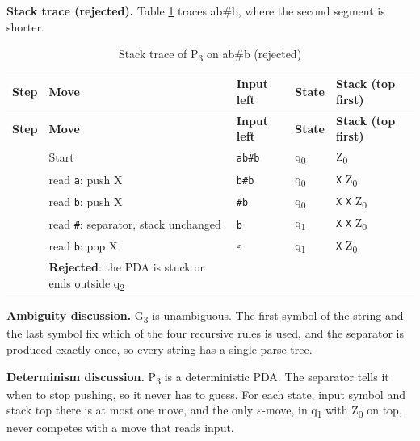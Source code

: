 \documentclass[12pt,a4paper]{article}
\begin{document}
\textbf{Stack trace (rejected).} Table \ref{tab:seg_tr2} traces ab\#b, where the second segment is shorter.

{\footnotesize
\begin{longtable}{|>{\centering\arraybackslash}p{}|>{\raggedright\arraybackslash}p{}|>{\raggedright\arraybackslash}p{}|>{\centering\arraybackslash}p{}|>{\raggedright\arraybackslash}p{}|}
\caption[Stack trace of P3 on ab\#b (rejected)]{Stack trace of P\textsubscript{3} on ab\#b (rejected)}\label{tab:seg_tr2}\\
\hline
\rowcolor{hdr}\textbf{Step} & \textbf{Move} & \textbf{Input left} & \textbf{State} & \textbf{Stack (top first)}\\ \hline
\endfirsthead
\hline
\rowcolor{hdr}\textbf{Step} & \textbf{Move} & \textbf{Input left} & \textbf{State} & \textbf{Stack (top first)}\\ \hline
\endhead
0 & Start & \texttt{ab\#b} & q\textsubscript{0} & Z\textsubscript{0}\\ \hline
1 & read \texttt{a}: push X & \texttt{b\#b} & q\textsubscript{0} & \texttt{X}  Z\textsubscript{0}\\ \hline
2 & read \texttt{b}: push X & \texttt{\#b} & q\textsubscript{0} & \texttt{X}  \texttt{X}  Z\textsubscript{0}\\ \hline
3 & read \texttt{\#}: separator, stack unchanged & \texttt{b} & q\textsubscript{1} & \texttt{X}  \texttt{X}  Z\textsubscript{0}\\ \hline
4 & read \texttt{b}: pop X & \ensuremath{\varepsilon} & q\textsubscript{1} & \texttt{X}  Z\textsubscript{0}\\ \hline
 & \textbf{Rejected}: the PDA is stuck or ends outside q\textsubscript{2} &  &  & \\ \hline
\end{longtable}}

\textbf{Ambiguity discussion.} G\textsubscript{3} is unambiguous. The first symbol of the string and the last symbol fix which of the four recursive rules is used, and the separator is produced exactly once, so every string has a single parse tree.

\textbf{Determinism discussion.} P\textsubscript{3} is a deterministic PDA. The separator tells it when to stop pushing, so it never has to guess. For each state, input symbol and stack top there is at most one move, and the only \ensuremath{\varepsilon}-move, in q\textsubscript{1} with Z\textsubscript{0} on top, never competes with a move that reads input.
\end{document}
